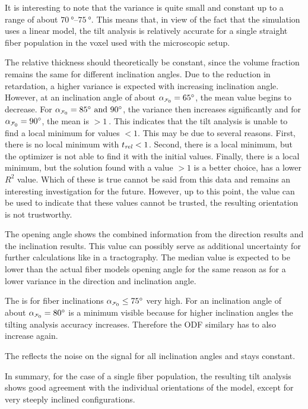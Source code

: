 It is interesting to note that the variance is quite small and constant up to a range of about $\SIrange{70}{75}{\degree}$.
This means that, in view of the fact that the simulation uses a linear model, the tilt analysis is relatively accurate for a single straight fiber population in the voxel used with the microscopic setup.
\par
%
The relative thickness \trel{} should theoretically be constant, since the volume fraction remains the same for different inclination angles.
Due to the reduction in retardation, a higher variance is expected with increasing inclination angle.
However, at an inclination angle of about $\modelInc=\SI{65}{\degree}$, the mean value begins to decrease.
For $\modelInc=\SIlist{85;90}{\degree}$, the variance then increases significantly and for $\modelInc=\SI{90}{\degree}$, the mean is $>\SI{1}{}$.
This indicates that the tilt analysis is unable to find a local minimum for \trel{} values $<1$.
This may be due to several reasons.
First, there is no local minimum with $\textnormal{$t_\mathit{rel}$}<1$.
Second, there is a local minimum, but the optimizer is not able to find it with the initial values.
Finally, there is a local minimum, but the solution found with a \trel{} value $>1$ is a better choice, \ie{} has a lower $R^2$ value.
Which of these is true cannot be said from this data and remains an interesting investigation for the future.
However, up to this point, the \trel{} value can be used to indicate that these values cannot be trusted, \ie{} the resulting orientation is not trustworthy.
\par
%
The opening angle shows the combined information from the direction results and the inclination results.
This value can possibly serve as additional uncertainty for further calculations like in a tractography.
The median value is expected to be lower than the actual fiber models opening angle for the same reason as for a lower \bvariance{} variance in the direction and inclination angle.
\par
%
The \accvalue{} is for fiber inclinations $\modelInc \leq \SI{75}{\degree}$ very high.
For an inclination angle of about $\modelInc = \SI{80}{\degree}$ is a minimum visible because for higher inclination angles the tilting analysis accuracy increases.
Therefore the \ac{ODF} similary has to also increase again.
\par
% 
The \rvalue{} reflects the noise on the signal for all inclination angles and stays constant.
\par
% 
In summary, for the case of a single fiber population, the resulting tilt analysis shows good agreement with the individual orientations of the model, except for very steeply inclined configurations.
%
% 
% 
